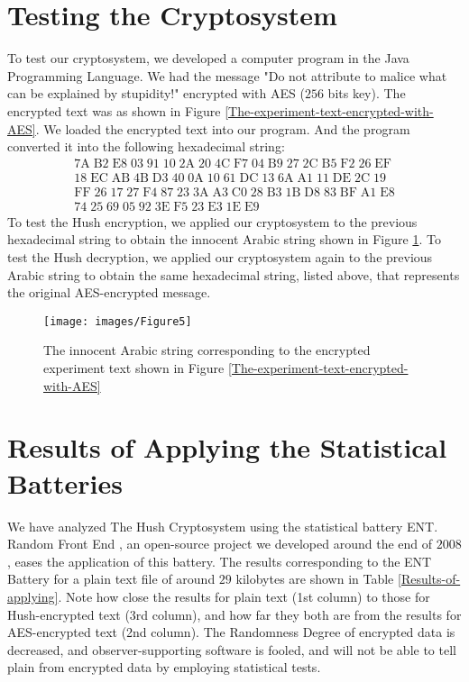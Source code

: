 \documentclass{acm_proc_article-sp}
\begin{document}
\section{Testing the Cryptosystem}\label{Testing-the-Cryptosystem}
To test our cryptosystem, we developed a computer program in the Java Programming Language. We had the message "Do not attribute to malice what can be explained by stupidity!" encrypted with AES ($256$ bits key). The encrypted text was as shown in Figure \ref{The-experiment-text-encrypted-with-AES}. We loaded the encrypted text into our program. And the program converted it into the following hexadecimal string:
\begin{equation*}
    \begin{array}{c}
    \mathrm{7A\;B2\;E8\;03\;91\;10\;2A\;20\;4C\;F7\;04\;B9\;27\;2C\;B5\;F2\;26\;EF}\\
    \mathrm{18\;EC\;AB\;4B\;D3\;40\;0A\;10\;61\;DC\;13\;6A\;A1\;11\;DE\;2C\;19}\\
    \mathrm{FF\;26\;17\;27\;F4\;87\;23\;3A\;A3\;C0\;28\;B3\;1B\;D8\;83\;BF\;A1\;E8}\\
    \mathrm{74\;25\;69\;05\;92\;3E\;F5\;23\;E3\;1E\;E9}
    \end{array}
\end{equation*}
To test the Hush encryption, we applied our cryptosystem to the previous hexadecimal string to obtain the innocent Arabic string shown in Figure \ref{The-innocent-Arabic-string}. To test the Hush decryption, we applied our cryptosystem again to the previous Arabic string to obtain the same hexadecimal string, listed above, that represents the original AES-encrypted message.

\begin{figure}
  \centering
  \texttt{[image: images/Figure5]}
  \caption{The innocent Arabic string corresponding to the encrypted experiment text shown in Figure \ref{The-experiment-text-encrypted-with-AES}}\label{The-innocent-Arabic-string}
\end{figure}

\section{Results of Applying the Statistical Batteries}\label{Results-of-Applying-the-Statistical-Batteries}
We have analyzed The Hush Cryptosystem using the statistical battery ENT. Random Front End \cite{Hussein}, an open-source project we developed around the end of $2008$, eases the application of this battery. The results corresponding to the ENT Battery for a plain text file of around $29$ kilobytes are shown in Table \ref{Results-of-applying}. Note how close the results for plain text (1st column) to those for Hush-encrypted text (3rd column), and how far they both are from the results for AES-encrypted text (2nd column). The Randomness Degree of encrypted data is decreased, and observer-supporting software is fooled, and will not be able to tell plain from encrypted data by employing statistical tests.
\end{document}
